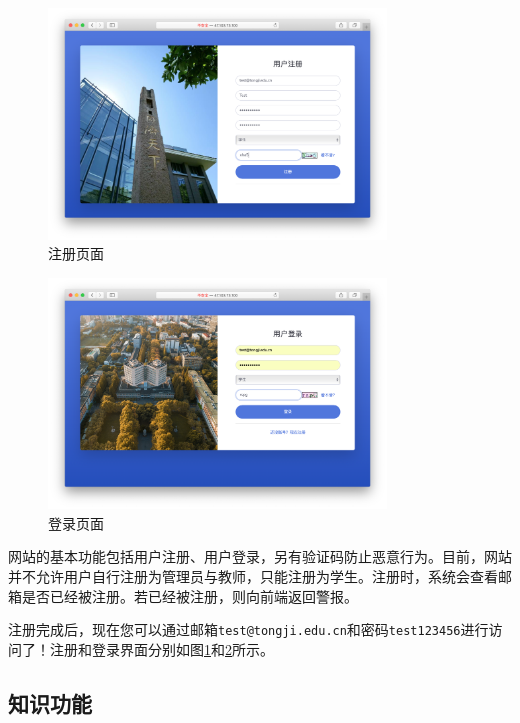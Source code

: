 \documentclass{nwafucoursepaper}
\begin{document}
\begin{figure}[htp]
  \centering
  \includegraphics[width=0.8\textwidth]{register.png}
  \caption{注册页面}
  \label{register}
\end{figure}

\begin{figure}[htp]
  \centering
  \includegraphics[width=0.8\textwidth]{login.png}
  \caption{登录页面}
  \label{login}
\end{figure}

网站的基本功能包括用户注册、用户登录，另有验证码防止恶意行为。目前，网站并不允许用户自行注册为管理员与教师，只能注册为学生。注册时，系统会查看邮箱是否已经被注册。若已经被注册，则向前端返回警报。

注册完成后，现在您可以通过邮箱\verb|test@tongji.edu.cn|和密码\verb|test123456|进行访问了！注册和登录界面分别如图\ref{register}和\ref{login}所示。

\subsection{知识功能}
\end{document}
